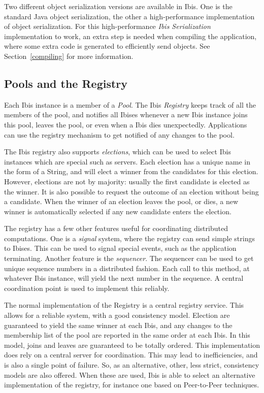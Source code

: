 \documentclass[10pt]{article}
\begin{document}
Two different object serialization versions are available in Ibis. One is
the standard Java object serialization, the other a high-performance
implementation of object serialization. For this high-performance
\emph{Ibis Serialization} implementation to work, an extra step is needed
when compiling the application, where some extra code is generated to
efficiently send objects. See Section~\ref{compiling} for
more information.

\subsection{Pools and the Registry}


Each Ibis instance is a member of a \emph{Pool}. The Ibis
\emph{Registry} keeps track of all the members of the pool, and notifies
all Ibises whenever a new Ibis instance joins this pool, leaves the
pool, or even when a Ibis dies unexpectedly. Applications can use the
registry mechanism to get notified of any changes to the pool.

The Ibis registry also supports \emph{elections}, which can be used to
select Ibis instances which are special such as servers.  Each election
has a unique name in the form of a String, and will elect a winner from
the candidates for this election. However, elections are not by
majority:
usually the first candidate is elected as the winner. It is also
possible to request the outcome of an election without being a
candidate. When the winner of an election leaves the pool, or dies, a
new winner is automatically selected if any new candidate enters the
election.

The registry has a few other features useful for coordinating
distributed computations. One is a \emph{signal} system, where the
registry can send simple strings to Ibises. This can be used to signal
special events, such as the application terminating. Another feature is
the \emph{sequencer}. The sequencer can be used to get unique sequence
numbers in a distributed fashion. Each call to this method, at
whatever Ibis instance, will yield the next number in the sequence. A
central coordination point is used to implement this reliably.

The normal implementation of the Registry is a central registry service.
This allows for a reliable system, with a good consistency model.
Election are guaranteed to yield the same winner at each Ibis, and any
changes to the membership list of the pool are reported in the same
order at each Ibis. In this model, joins and leaves are guaranteed to be
totally ordered. This implementation does rely on a central server
for coordination. This may lead to inefficiencies, and is also a single
point of failure. So, as an alternative, other, less strict, consistency
models are also offered. When these are used, Ibis is able to select an
alternative implementation of the registry, for instance one based on
Peer-to-Peer techniques.
\end{document}

